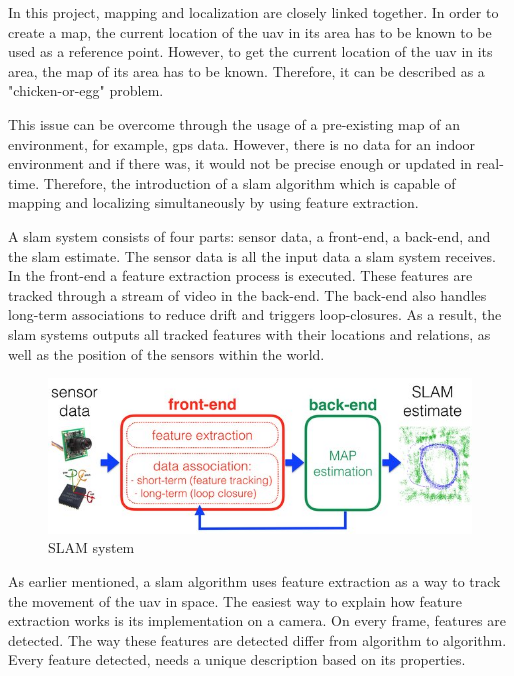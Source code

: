 In this project, mapping and localization are closely linked together. In order to create a map, the current location of the \acs{uav} in its area has to be known to be used as a reference point. However, to get the current location of the \acs{uav} in its area, the map of its area has to be known. Therefore, it can be described as a "chicken\hyp{}or\hyp{}egg" problem.

This issue can be overcome through the usage of a pre-existing map of an environment, for example, \acs{gps} data. However, there is no data for an indoor environment and if there was, it would not be precise enough or updated in real\hyp{}time. Therefore, the introduction of a \acs{slam} algorithm which is capable of mapping and localizing simultaneously by using feature extraction. \cite{slam_tech_and_tracking}

A \acs{slam} system consists of four parts: sensor data, a front\hyp{}end, a back\hyp{}end, and the \acs{slam} estimate. The sensor data is all the input data a \acs{slam} system receives. In the front\hyp{}end a feature extraction process is executed. These features are tracked through a stream of video in the back\hyp{}end. The back\hyp{}end also handles long\hyp{}term associations to reduce drift and triggers loop\hyp{}closures. As a result, the \acs{slam} systems outputs all tracked features with their locations and relations, as well as the position of the sensors within the world. \cite{andreas_jakl_slam}

\begin{figure}[!h]
  \centering
  \includegraphics[width=0.75\linewidth]{images/slam_system.jpg}
  \caption{SLAM system \cite{fe_be_slam_system}}
  \label{fig:slam_system}
\end{figure}

As earlier mentioned, a \acs{slam} algorithm uses feature extraction as a way to track the movement of the \acs{uav} in space. The easiest way to explain how feature extraction works is its implementation on a camera. On every frame, features are detected. The way these features are detected differ from algorithm to algorithm. Every feature detected, needs a unique description based on its properties. \cite{andreas_jakl_basics_of_ar}

